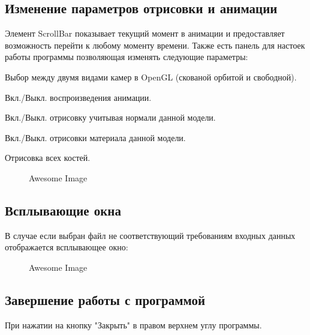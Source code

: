\subsection{Изменение параметров отрисовки и анимации}
Элемент ScrollBar показывает текущий момент в анимации и предоставляет 
возможность перейти к любому моменту времени. Также есть панель для настоек работы программы позволяющая изменять следующие параметры:
\begin{my_enumerate}
\item Выбор между двумя видами камер в OpenGL (скованой орбитой и свободной).
\item Вкл./Выкл. воспроизведения анимации.
\item Вкл./Выкл. отрисовку учитывая нормали данной модели.
\item Вкл./Выкл. отрисовки материала данной модели.
\item Отрисовка всех костей.
\end{my_enumerate}


\begin{figure}[h!]
    \centering
    \caption{Awesome Image}
    \label{fig:awesome_image}
\end{figure}


\subsection{Всплывающие окна}
В случае если выбран файл не соответствующий требованиям входных данных отображается всплывающее окно:
\begin{figure}[h!]
    \centering
    \caption{Awesome Image}
    \label{fig:awesome_image}
\end{figure}


\subsection{Завершение работы с программой}

При нажатии на кнопку "Закрыть" в правом верхнем углу программы.
